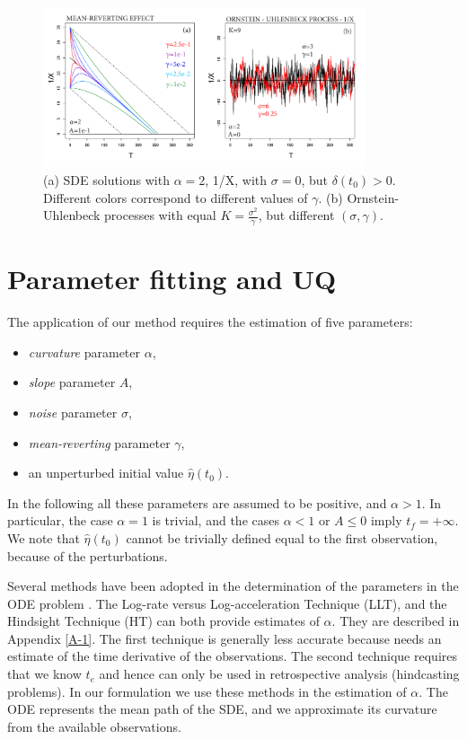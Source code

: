 \documentclass{article}
\begin{document}
\begin{figure}[H]
\centering
\includegraphics[width=0.85\textwidth]{Fig3_plus.png}
\caption{(a) SDE solutions with $\alpha=2$, 1/X, with $\sigma=0$, but $\delta(t_0)>0$. Different colors correspond to different values of $\gamma$. (b) Ornstein-Uhlenbeck processes with equal $K=\frac{\sigma^2}{\gamma}$, but different $(\sigma, \gamma)$.}
\label{Fig3}
\end{figure}

\newpage
\section{Parameter fitting and UQ}
The application of our method requires the estimation of five parameters:
\begin{itemize}
  \item {\it curvature} parameter $\alpha$,
  \item {\it slope} parameter $A$,
  \item {\it noise} parameter $\sigma$,
  \item {\it mean-reverting} parameter $\gamma$,
  \item an unperturbed initial value $\hat\eta(t_0)$.
\end{itemize}
In the following all these parameters are assumed to be positive, and $\alpha > 1$. In particular, the case $\alpha=1$ is trivial, and the cases $\alpha <1$ or $A\le0$ imply $t_f=+\infty$. We note that $\hat\eta(t_0)$ cannot be trivially defined equal to the first observation, because of the perturbations.

Several methods have been adopted in the determination of the parameters in the ODE problem \citep{Voight1988, Cornelius1995, Bell2011}. The Log-rate versus Log-acceleration Technique (LLT), and the Hindsight Technique (HT) can both provide estimates of $\alpha$. They are described in Appendix \ref{A-1}. The first technique is generally less accurate because needs an estimate of the time derivative of the observations. The second technique requires that we know $t_e$ and hence can only be used in retrospective analysis (hindcasting problems). In our formulation we use these methods in the estimation of $\alpha$. The ODE represents the mean path of the SDE, and we approximate its curvature from the available observations.
\end{document}
